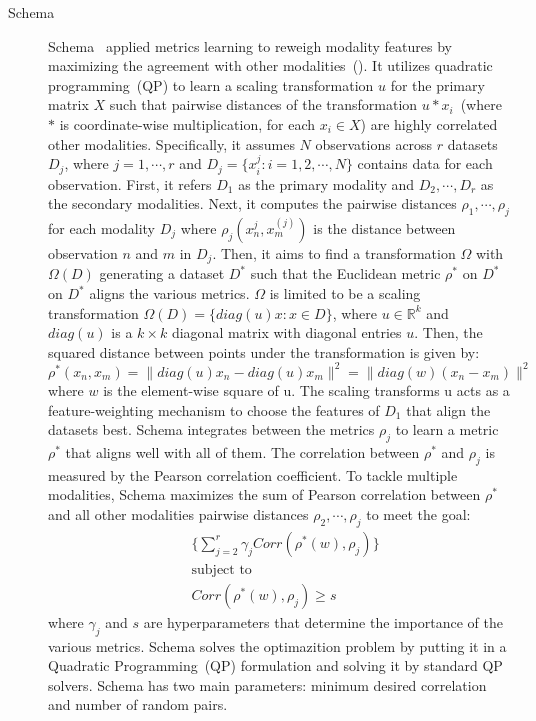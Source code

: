 \begin{description}
  \item[Schema]
  Schema~\citep{singh2021schema} applied metrics learning to reweigh modality features by maximizing the agreement with other modalities~(). It utilizes quadratic programming~(QP) to learn a scaling transformation $u$ for the primary matrix $X$ such that pairwise distances of the transformation $u * x_i$~(where $*$ is coordinate-wise multiplication, for each $x_i\in X$) are highly correlated other modalities. Specifically, it assumes $N$ observations across $r$ datasets $D_j$, where $j=1,\cdots,r$ and $D_j = \{x_i^{j}: i = 1,2,\cdots,N\}$ contains data for each observation. First, it refers $D_1$ as the primary modality and $D_2,\cdots,D_r$ as the secondary modalities. Next, it computes the pairwise distances $\rho_1,\cdots,\rho_j$ for each modality $D_j$ where $\rho_j(x_n^{j}, x_m^{(j)})$ is the distance between observation $n$ and $m$ in $D_j$. Then, it aims to find a transformation $\Omega$ with $\Omega(D)$ generating a dataset $D^{*}$ such that the Euclidean metric $\rho^{*}$ on $D^{*}$ on $D^{*}$ aligns the various metrics. $\Omega$ is limited to be a scaling transformation $\Omega(D) = \{diag(u)x: x \in D\}$, where $u \in \mathbb{R}^{k}$ and $diag(u)$ is a $k\times k$ diagonal matrix with diagonal entries $u$. Then, the squared distance between points under the transformation is given by:
  \begin{equation}
  \rho^{*}(x_n, x_m) = \|diag(u)x_n - diag(u)x_m\|^2 = \|diag(w)(x_n - x_m)\|^2
  \end{equation}
  where $w$ is the element-wise square of u. The scaling transforms u acts as a feature-weighting mechanism to choose the features of $D_1$ that align the datasets best. Schema integrates between the metrics $\rho_j$ to learn a metric $\rho^{*}$ that aligns well with all of them. The correlation between $\rho^{*}$ and $\rho_j$ is measured by the Pearson correlation coefficient. To tackle multiple modalities, Schema maximizes the sum of Pearson correlation between $\rho^{*}$ and all other modalities pairwise distances $\rho_2,\cdots,\rho_j$ to meet the goal:
  \begin{equation}
  \begin{aligned}
    &\bigg\{\sum_{j=2}^{r} \gamma_j Corr(\rho^{*}(w), \rho_j)\bigg\} \\
    &\text{subject to}\\
    &Corr(\rho^{*}(w), \rho_j) \geq s
 \end{aligned}
  \end{equation}
  where $\gamma_j$ and $s$ are hyperparameters that determine the importance of the various metrics. Schema solves the optimazition problem by putting it in a Quadratic Programming~(QP) formulation and solving it by standard QP solvers. Schema has two main parameters: minimum desired correlation and number of random pairs.



\end{description}

